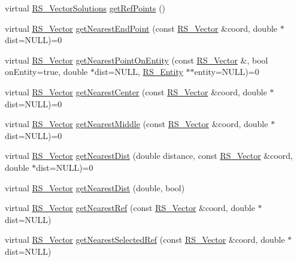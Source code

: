 \begin{DoxyCompactItemize}
\item 
virtual \hyperlink{class_r_s___vector_solutions}{R\-S\-\_\-\-Vector\-Solutions} \hyperlink{class_r_s___entity_a643485f2d50de736f961eefbb7b0f9e2}{get\-Ref\-Points} ()
\item 
virtual \hyperlink{class_r_s___vector}{R\-S\-\_\-\-Vector} \hyperlink{class_r_s___entity_a07dc91d40d674cbf6e95b148b90235d3}{get\-Nearest\-End\-Point} (const \hyperlink{class_r_s___vector}{R\-S\-\_\-\-Vector} \&coord, double $\ast$dist=N\-U\-L\-L)=0
\item 
virtual \hyperlink{class_r_s___vector}{R\-S\-\_\-\-Vector} \hyperlink{class_r_s___entity_aa1dffbb68f89f7a5fa6c8028df2697b5}{get\-Nearest\-Point\-On\-Entity} (const \hyperlink{class_r_s___vector}{R\-S\-\_\-\-Vector} \&, bool on\-Entity=true, double $\ast$dist=N\-U\-L\-L, \hyperlink{class_r_s___entity}{R\-S\-\_\-\-Entity} $\ast$$\ast$entity=N\-U\-L\-L)=0
\item 
virtual \hyperlink{class_r_s___vector}{R\-S\-\_\-\-Vector} \hyperlink{class_r_s___entity_af9d394411665478aa2f6aca1ac67ba86}{get\-Nearest\-Center} (const \hyperlink{class_r_s___vector}{R\-S\-\_\-\-Vector} \&coord, double $\ast$dist=N\-U\-L\-L)=0
\item 
virtual \hyperlink{class_r_s___vector}{R\-S\-\_\-\-Vector} \hyperlink{class_r_s___entity_ab654e95d16a324fd29afcc76968771d8}{get\-Nearest\-Middle} (const \hyperlink{class_r_s___vector}{R\-S\-\_\-\-Vector} \&coord, double $\ast$dist=N\-U\-L\-L)=0
\item 
virtual \hyperlink{class_r_s___vector}{R\-S\-\_\-\-Vector} \hyperlink{class_r_s___entity_a73cedae7d3f54292d8be43e4d9f6fb4d}{get\-Nearest\-Dist} (double distance, const \hyperlink{class_r_s___vector}{R\-S\-\_\-\-Vector} \&coord, double $\ast$dist=N\-U\-L\-L)=0
\item 
virtual \hyperlink{class_r_s___vector}{R\-S\-\_\-\-Vector} \hyperlink{class_r_s___entity_a1879785bfb719572b8760378cb3717fc}{get\-Nearest\-Dist} (double, bool)
\item 
virtual \hyperlink{class_r_s___vector}{R\-S\-\_\-\-Vector} \hyperlink{class_r_s___entity_a89d39a2eba218cd0142744f88e3af112}{get\-Nearest\-Ref} (const \hyperlink{class_r_s___vector}{R\-S\-\_\-\-Vector} \&coord, double $\ast$dist=N\-U\-L\-L)
\item 
virtual \hyperlink{class_r_s___vector}{R\-S\-\_\-\-Vector} \hyperlink{class_r_s___entity_af940ae16da3de4872eafefe792ece20e}{get\-Nearest\-Selected\-Ref} (const \hyperlink{class_r_s___vector}{R\-S\-\_\-\-Vector} \&coord, double $\ast$dist=N\-U\-L\-L)
\item 
$$
\end{DoxyCompactItemize}
